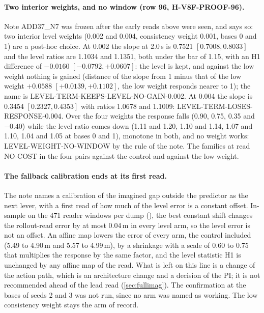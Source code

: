 \paragraph{Two interior weights, and no window (row 96, H-V8F-PROOF-96).} Note ADD37\_N7 was frozen after the early reads above were seen, and says so: two interior level weights (0.002 and 0.004, consistency weight 0.001, bases 0 and 1) are a post-hoc choice. At 0.002 the slope at 2.0\,s is 0.7521 $[0.7008,0.8033]$ and the level ratios are 1.1034 and 1.1351, both under the bar of 1.15, with an H1 difference of $-0.0160$ $[-0.0792,+0.0607]$: the level is kept, and against the low weight nothing is gained (distance of the slope from 1 minus that of the low weight $+0.0588$ $[+0.0139,+0.1102]$, the low weight responds nearer to 1); the name is LEVEL-TERM-KEEPS-LEVEL-NO-GAIN-0.002. At 0.004 the slope is 0.3454 $[0.2327,0.4353]$ with ratios 1.0678 and 1.1009: LEVEL-TERM-LOSES-RESPONSE-0.004. Over the four weights the response falls (0.90, 0.75, 0.35 and $-0.40$) while the level ratio comes down (1.11 and 1.20, 1.10 and 1.14, 1.07 and 1.10, 1.04 and 1.05 at bases 0 and 1), monotone in both, and no weight works: LEVEL-WEIGHT-NO-WINDOW by the rule of the note. The families at  read NO-COST in the four pairs against the control and against the low weight.

\paragraph{The fallback calibration ends at its first read.} The note names a calibration of the imagined gap outside the predictor as the next lever, with a first read of how much of the level error is a constant offset. In-sample on the 471 reader windows per dump (), the best constant shift changes the rollout-read error by at most 0.04\,m in every level arm, so the level error is not an offset. An affine map lowers the error of every arm, the control included (5.49 to 4.90\,m and 5.57 to 4.99\,m), by a shrinkage with a scale of 0.60 to 0.75 that multiplies the response by the same factor, and the level statistic H1 is unchanged by any affine map of the read. What is left on this line is a change of the action path, which is an architecture change and a decision of the PI; it is not recommended ahead of the lead read (\cref{sec:fullimag}). The confirmation at the bases of seeds 2 and 3 was not run, since no arm was named as working. The low consistency weight stays the arm of record.
